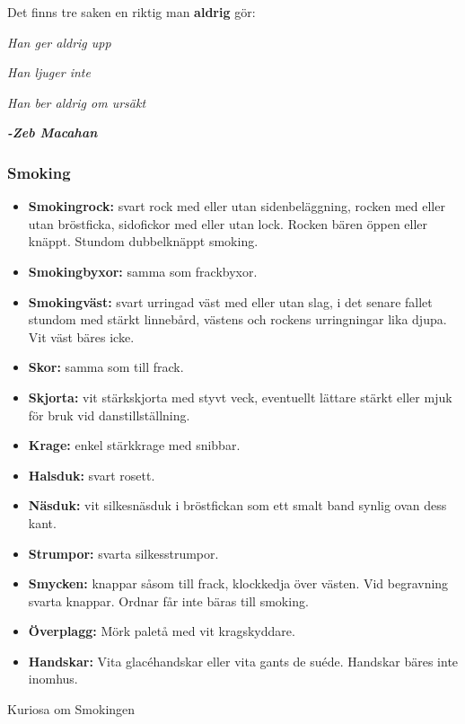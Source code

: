     Det finns tre saken en riktig man \textbf{aldrig} gör:

    \textit{Han ger aldrig upp}
    
    \textit{Han ljuger inte}
    
    \textit{Han ber aldrig om ursäkt}
    
    \textit{\textbf{-Zeb Macahan}} 

    \subsubsection*{\textbf{Smoking}}

    \begin{itemize}
        
        \item[]\textbf{Smokingrock:} svart rock med eller utan sidenbeläggning, rocken med eller utan bröstficka, sidofickor med eller utan lock. Rocken bären öppen eller knäppt. Stundom dubbelknäppt smoking.
        
        \item[]\textbf{Smokingbyxor:} samma som frackbyxor.
        
        \item[]\textbf{Smokingväst:} svart urringad väst med eller utan slag, i det senare fallet stundom med stärkt linnebård, västens och rockens urringningar lika djupa. Vit väst bäres icke.
        
        \item[]\textbf{Skor:} samma som till frack.
        
        \item[]\textbf{Skjorta:} vit stärkskjorta med styvt veck, eventuellt lättare stärkt eller mjuk för bruk vid danstillställning.
        
        \item[]\textbf{Krage:} enkel stärkkrage med snibbar.
        
        \item[]\textbf{Halsduk:} svart rosett.
        
        \item[]\textbf{Näsduk:} vit silkesnäsduk i bröstfickan som ett smalt band synlig ovan dess kant.
        
        \item[]\textbf{Strumpor:} svarta silkesstrumpor.
        
        \item[]\textbf{Smycken:} knappar såsom till frack, klockkedja över västen. Vid begravning svarta knappar. Ordnar får inte bäras till smoking.
        
        \item[]\textbf{Överplagg:} Mörk paletå med vit kragskyddare.
        
        \item[]\textbf{Handskar:} Vita glacéhandskar eller vita gants de suéde. Handskar bäres inte inomhus.
        
    \end{itemize}
    Kuriosa om Smokingen

